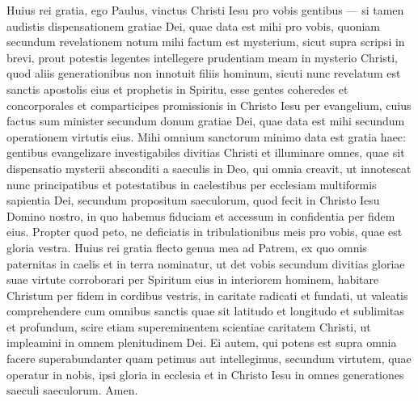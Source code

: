 \begin{biblechapter}  
\verse Huius rei gratia, ego Paulus, vinctus Christi Iesu pro vobis gentibus — 
\verse si tamen audistis dispensationem gratiae Dei, quae data est mihi pro vobis, 
\verse quoniam secundum revelationem notum mihi factum est mysterium, sicut supra scripsi in brevi, 
\verse prout potestis legentes intellegere prudentiam meam in mysterio Christi, 
\verse quod aliis generationibus non innotuit filiis hominum, sicuti nunc revelatum est sanctis apostolis eius et prophetis in Spiritu, 
\verse esse gentes coheredes et concorporales et comparticipes promissionis in Christo Iesu per evangelium, 
\verse cuius factus sum minister secundum donum gratiae Dei, quae data est mihi secundum operationem virtutis eius. 
\verse Mihi omnium sanctorum minimo data est gratia haec: gentibus evangelizare investigabiles divitias Christi 
\verse et illuminare omnes, quae sit dispensatio mysterii absconditi a saeculis in Deo, qui omnia creavit, 
\verse ut innotescat nunc principatibus et potestatibus in caelestibus per ecclesiam multiformis sapientia Dei, 
\verse secundum propositum saeculorum, quod fecit in Christo Iesu Domino nostro, 
\verse in quo habemus fiduciam et accessum in confidentia per fidem eius. 
\verse Propter quod peto, ne deficiatis in tribulationibus meis pro vobis, quae est gloria vestra. 
\verse Huius rei gratia flecto genua mea ad Patrem, 
\verse ex quo omnis paternitas in caelis et in terra nominatur, 
\verse ut det vobis secundum divitias gloriae suae virtute corroborari per Spiritum eius in interiorem hominem, 
\verse habitare Christum per fidem in cordibus vestris, in caritate radicati et fundati, 
\verse ut valeatis comprehendere cum omnibus sanctis quae sit latitudo et longitudo et sublimitas et profundum, 
\verse scire etiam supereminentem scientiae caritatem Christi, ut impleamini in omnem plenitudinem Dei. 
\verse Ei autem, qui potens est supra omnia facere superabundanter quam petimus aut intellegimus, secundum virtutem, quae operatur in nobis, 
\verse ipsi gloria in ecclesia et in Christo Iesu in omnes generationes saeculi saeculorum. Amen. 
\end{biblechapter}

